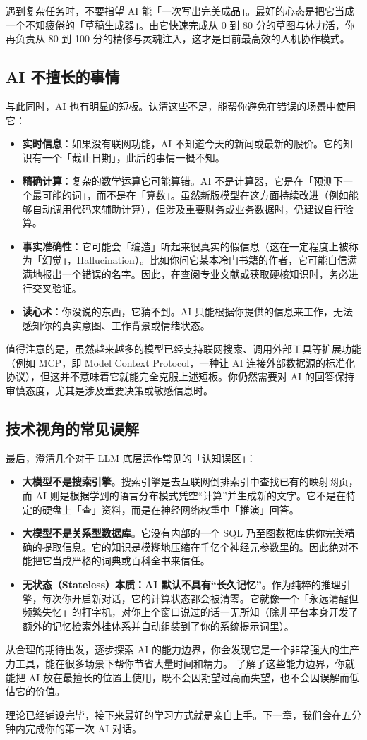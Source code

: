 \begin{tipbox}
遇到复杂任务时，不要指望 AI 能「一次写出完美成品」。最好的心态是把它当成一个不知疲倦的「草稿生成器」。由它快速完成从 0 到 80 分的草图与体力活，你再负责从 80 到 100 分的精修与灵魂注入，这才是目前最高效的人机协作模式。
\end{tipbox}

\subsection*{AI 不擅长的事情}

与此同时，AI 也有明显的短板。认清这些不足，能帮你避免在错误的场景中使用它：

\begin{itemize}
  \item \textbf{实时信息}：如果没有联网功能，AI 不知道今天的新闻或最新的股价。它的知识有一个「截止日期」，此后的事情一概不知。
  \item \textbf{精确计算}：复杂的数学运算它可能算错。AI 不是计算器，它是在「预测下一个最可能的词」，而不是在「算数」。虽然新版模型在这方面持续改进（例如能够自动调用代码来辅助计算），但涉及重要财务或业务数据时，仍建议自行验算。
  \item \textbf{事实准确性}：它可能会「编造」听起来很真实的假信息（这在一定程度上被称为「幻觉」，Hallucination）。比如你问它某本冷门书籍的作者，它可能自信满满地报出一个错误的名字。因此，在查阅专业文献或获取硬核知识时，务必进行交叉验证。
  \item \textbf{读心术}：你没说的东西，它猜不到。AI 只能根据你提供的信息来工作，无法感知你的真实意图、工作背景或情绪状态。
\end{itemize}

值得注意的是，虽然越来越多的模型已经支持联网搜索、调用外部工具等扩展功能（例如 MCP，即 Model Context Protocol，一种让 AI 连接外部数据源的标准化协议），但这并不意味着它就能完全克服上述短板。你仍然需要对 AI 的回答保持审慎态度，尤其是涉及重要决策或敏感信息时。

\subsection*{技术视角的常见误解}

最后，澄清几个对于 LLM 底层运作常见的「认知误区」：

\begin{itemize}
  \item \textbf{大模型不是搜索引擎}。搜索引擎是去互联网倒排索引中查找已有的映射网页，而 AI 则是根据学到的语言分布模式凭空“计算”并生成新的文字。它不是在特定的硬盘上「查」资料，而是在神经网络权重中「推演」回答。
  \item \textbf{大模型不是关系型数据库}。它没有内部的一个 SQL 乃至图数据库供你完美精确的提取信息。它的知识是模糊地压缩在千亿个神经元参数里的。因此绝对不能把它当成严格的词典或百科全书来信任。
  \item \textbf{无状态（Stateless）本质：AI 默认不具有“长久记忆”}。作为纯粹的推理引擎，每次你开启新对话，它的计算状态都会被清零。它就像一个「永远清醒但频繁失忆」的打字机，对你上个窗口说过的话一无所知（除非平台本身开发了额外的记忆检索外挂体系并自动组装到了你的系统提示词里）。
\end{itemize}

从合理的期待出发，逐步探索 AI 的能力边界，你会发现它是一个非常强大的生产力工具，能在很多场景下帮你节省大量时间和精力。
了解了这些能力边界，你就能把 AI 放在最擅长的位置上使用，既不会因期望过高而失望，也不会因误解而低估它的价值。

理论已经铺设完毕，接下来最好的学习方式就是亲自上手。下一章，我们会在五分钟内完成你的第一次 AI 对话。
